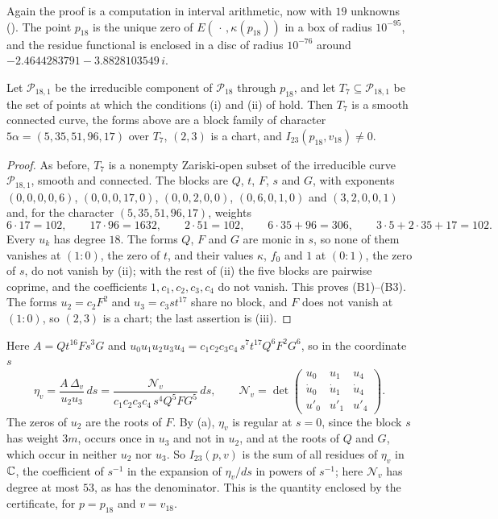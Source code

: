 Again the proof is a computation in interval arithmetic, now with $19$
unknowns (). The point $p_{18}$ is the unique zero of
$E(\,\cdot\,,\kappa(p_{18}))$ in a box of radius $10^{-95}$, and the residue
functional is enclosed in a disc of radius $10^{-76}$ around
$-2.4644283791-3.8828103549\,i$.

\begin{corollary}\label{cor:family51b}
Let $\mathcal P_{18,1}$ be the irreducible component of $\mathcal P_{18}$
through $p_{18}$, and let $T_{7}\subseteq\mathcal P_{18,1}$ be the set of
points at which the conditions \textup{(i)} and \textup{(ii)} of
 hold. Then $T_{7}$ is a smooth connected curve, the
forms above are a block family of character $5\alpha=(5,35,51,96,17)$ over
$T_{7}$, $(2,3)$ is a chart, and $I_{23}(p_{18},v_{18})\ne0$.
\end{corollary}

\begin{proof}
As before, $T_{7}$ is a nonempty Zariski-open subset of the irreducible
curve $\mathcal P_{18,1}$, smooth and connected. The blocks are $Q$, $t$,
$F$, $s$ and $G$, with exponents $(0,0,0,0,6)$, $(0,0,0,17,0)$,
$(0,0,2,0,0)$, $(0,6,0,1,0)$ and $(3,2,0,0,1)$ and, for the character
$(5,35,51,96,17)$, weights
\[
  6\cdot17=102,\qquad 17\cdot96=1632,\qquad 2\cdot51=102,\qquad
  6\cdot35+96=306,\qquad 3\cdot5+2\cdot35+17=102 .
\]
Every $u_{k}$ has degree $18$. The forms $Q$, $F$ and $G$ are monic in $s$,
so none of them vanishes at $(1:0)$, the zero of $t$, and their values
$\kappa$, $f_{0}$ and $1$ at $(0:1)$, the zero of $s$, do not vanish by
(ii); with the rest of (ii) the five blocks are pairwise coprime, and the
coefficients $1,c_{1},c_{2},c_{3},c_{4}$ do not vanish. This proves
(B1)--(B3). The forms $u_{2}=c_{2}F^{2}$ and $u_{3}=c_{3}st^{17}$ share no
block, and $F$ does not vanish at $(1:0)$, so $(2,3)$ is a chart; the last
assertion is (iii).
\end{proof}

Here $A=Qt^{16}Fs^{3}G$ and $u_{0}u_{1}u_{2}u_{3}u_{4}=c_{1}c_{2}c_{3}
c_{4}\,s^{7}t^{17}Q^{6}F^{2}G^{6}$, so in the coordinate $s$
\[
  \eta_{v}=\frac{A\,\Delta_{v}}{u_{2}u_{3}}\,ds=\frac{\mathcal N_{v}}
  {c_{1}c_{2}c_{3}c_{4}\,s^{4}Q^{5}FG^{5}}\,ds,\qquad\mathcal N_{v}=
  \det\begin{pmatrix}u_{0}&u_{1}&u_{4}\\ \dot u_{0}&\dot u_{1}&\dot u_{4}\\
  u'_{0}&u'_{1}&u'_{4}\end{pmatrix}.
\]
The zeros of $u_{2}$ are the roots of $F$. By (a),
$\eta_{v}$ is regular at $s=0$, since the block $s$ has weight $3m$, occurs
once in $u_{3}$ and not in $u_{2}$, and at the roots of $Q$ and $G$, which
occur in neither $u_{2}$ nor $u_{3}$. So $I_{23}(p,v)$ is the sum of all
residues of $\eta_{v}$ in $\mathbb{C}$, the coefficient of $s^{-1}$ in the
expansion of $\eta_{v}/ds$ in powers of $s^{-1}$; here $\mathcal N_{v}$ has
degree at most $53$, as has the denominator. This is the quantity enclosed
by the certificate, for $p=p_{18}$ and $v=v_{18}$.

